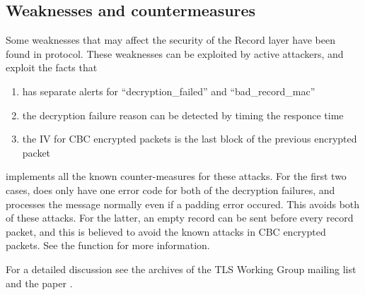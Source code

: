 \subsection{Weaknesses and countermeasures}

Some weaknesses that may affect the security of the Record layer have been
found in \tlsI{} protocol. These weaknesses can be exploited by active attackers,
and exploit the facts that \tls{} 
\begin{enumerate}
\item has separate alerts for ``decryption\_failed'' and ``bad\_record\_mac''
\item the decryption failure reason can be detected by timing the responce time
\item the IV for CBC encrypted packets is the last block of the previous encrypted packet
\end{enumerate}

\gnutls{} implements all the known counter-measures for these attacks. For the first
two cases, \gnutls{} does only have one error code for both of the decryption failures,
and processes the message normally even if a padding error occured. This avoids
both of these attacks.
For the latter, an empty record can be sent before every record packet, and this is
believed to avoid the known attacks in CBC encrypted packets. See the function
for more information.

For a detailed discussion see the archives of the TLS Working Group mailing list
and the paper \cite{CBCATT}.

